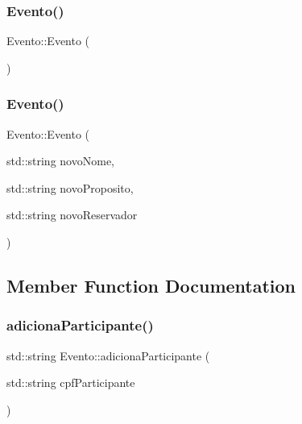 \subsubsection{Evento()\hspace{0.1cm}{\footnotesize\ttfamily [1/2]}}
{\footnotesize\ttfamily Evento\+::\+Evento (\begin{DoxyParamCaption}{ }\end{DoxyParamCaption})\hspace{0.3cm}{\ttfamily [inline]}}

\mbox{\label{class_evento_aa3f8ff6e86297a3fdb175eba570c88fe}} 
\subsubsection{Evento()\hspace{0.1cm}{\footnotesize\ttfamily [2/2]}}
{\footnotesize\ttfamily Evento\+::\+Evento (\begin{DoxyParamCaption}\item[{std\+::string}]{novo\+Nome,  }\item[{std\+::string}]{novo\+Proposito,  }\item[{std\+::string}]{novo\+Reservador }\end{DoxyParamCaption})\hspace{0.3cm}{\ttfamily [inline]}}



\subsection{Member Function Documentation}
\mbox{\label{class_evento_a51701b3dff0f062b5f531e9296cac841}} 
\subsubsection{adiciona\+Participante()}
{\footnotesize\ttfamily std\+::string Evento\+::adiciona\+Participante (\begin{DoxyParamCaption}\item[{std\+::string}]{cpf\+Participante }\end{DoxyParamCaption})\hspace{0.3cm}{\ttfamily [inline]}}

\mbox{\label{class_evento_a879d4014d8d4cc4c47ae4525f3627226}} 
